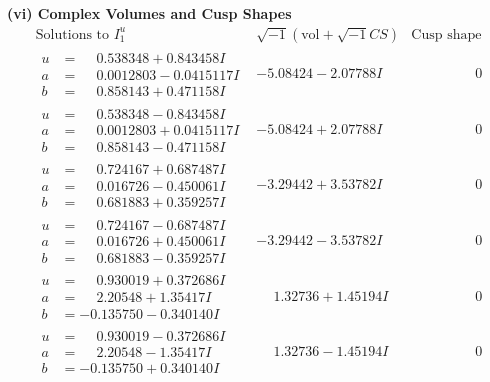 \documentclass[1p]{elsarticle_modified}
\theoremstyle{definition}
\newcommand{\I}{\sqrt{-1}}
\begin{document}
\newpage\flushleft \textbf{(vi) Complex Volumes and Cusp Shapes}
$$\begin{array}{c|c|c}  
\text{Solutions to }I^u_{1}& \I (\text{vol} + \sqrt{-1}CS) & \text{Cusp shape}\\
 \hline 
\begin{aligned}
u &= \phantom{-}0.538348 + 0.843458 I \\
a &= \phantom{-}0.0012803 - 0.0415117 I \\
b &= \phantom{-}0.858143 + 0.471158 I\end{aligned}
 & -5.08424 - 2.07788 I & \phantom{-0.000000 } 0 \\ \hline\begin{aligned}
u &= \phantom{-}0.538348 - 0.843458 I \\
a &= \phantom{-}0.0012803 + 0.0415117 I \\
b &= \phantom{-}0.858143 - 0.471158 I\end{aligned}
 & -5.08424 + 2.07788 I & \phantom{-0.000000 } 0 \\ \hline\begin{aligned}
u &= \phantom{-}0.724167 + 0.687487 I \\
a &= \phantom{-}0.016726 - 0.450061 I \\
b &= \phantom{-}0.681883 + 0.359257 I\end{aligned}
 & -3.29442 + 3.53782 I & \phantom{-0.000000 } 0 \\ \hline\begin{aligned}
u &= \phantom{-}0.724167 - 0.687487 I \\
a &= \phantom{-}0.016726 + 0.450061 I \\
b &= \phantom{-}0.681883 - 0.359257 I\end{aligned}
 & -3.29442 - 3.53782 I & \phantom{-0.000000 } 0 \\ \hline\begin{aligned}
u &= \phantom{-}0.930019 + 0.372686 I \\
a &= \phantom{-}2.20548 + 1.35417 I \\
b &= -0.135750 - 0.340140 I\end{aligned}
 & \phantom{-}1.32736 + 1.45194 I & \phantom{-0.000000 } 0 \\ \hline\begin{aligned}
u &= \phantom{-}0.930019 - 0.372686 I \\
a &= \phantom{-}2.20548 - 1.35417 I \\
b &= -0.135750 + 0.340140 I\end{aligned}
 & \phantom{-}1.32736 - 1.45194 I & \phantom{-0.000000 } 0 \\ \hline\begin{aligned}

\end{aligned}
\end{array}$$
\end{document}
